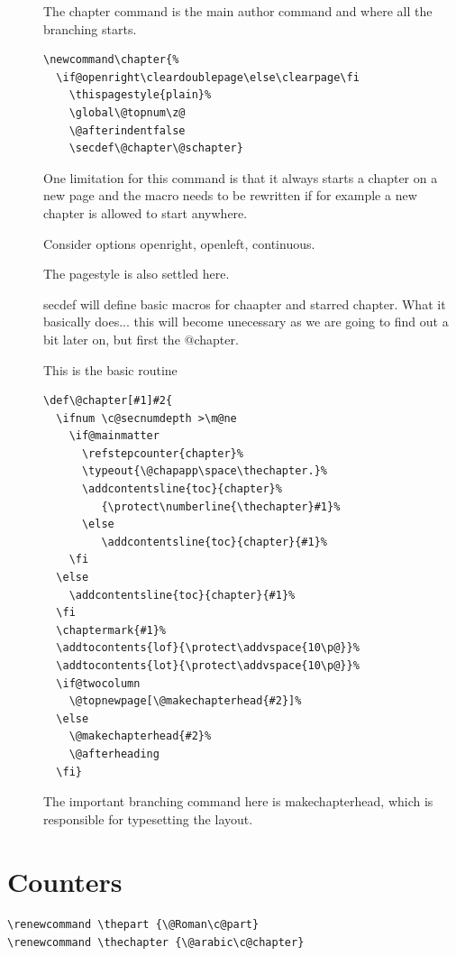 \begin{multicols}{2}
\begin{description}
\item [\string\chapter] The chapter command is the main author command and where all the branching starts.
    \begin{verbatim}
\newcommand\chapter{%
  \if@openright\cleardoublepage\else\clearpage\fi
    \thispagestyle{plain}%
    \global\@topnum\z@
    \@afterindentfalse
    \secdef\@chapter\@schapter}
    \end{verbatim}

One limitation for this command is that it always starts a chapter on a new page and the macro needs to be rewritten if for example a new chapter is allowed to start anywhere.

Consider options openright, openleft, continuous.

The pagestyle is also settled here.

secdef will define basic macros for chaapter and starred chapter. What it basically does... this will become unecessary as we are going to find out a bit later on, but first the @chapter.

\item [\string\@chapter] This is the basic routine
\begin{verbatim}
\def\@chapter[#1]#2{
  \ifnum \c@secnumdepth >\m@ne
    \if@mainmatter
      \refstepcounter{chapter}%
      \typeout{\@chapapp\space\thechapter.}%
      \addcontentsline{toc}{chapter}%
         {\protect\numberline{\thechapter}#1}%
      \else
         \addcontentsline{toc}{chapter}{#1}%
    \fi
  \else
    \addcontentsline{toc}{chapter}{#1}%
  \fi
  \chaptermark{#1}%
  \addtocontents{lof}{\protect\addvspace{10\p@}}%
  \addtocontents{lot}{\protect\addvspace{10\p@}}%
  \if@twocolumn
    \@topnewpage[\@makechapterhead{#2}]%
  \else
    \@makechapterhead{#2}%
    \@afterheading
  \fi}
\end{verbatim}
  The important branching command here is makechapterhead,   which is responsible for typesetting the layout.

\end{description}
\end{multicols}


\section{Counters}
\begin{verbatim}
\renewcommand \thepart {\@Roman\c@part}
\renewcommand \thechapter {\@arabic\c@chapter}
\end{verbatim}




